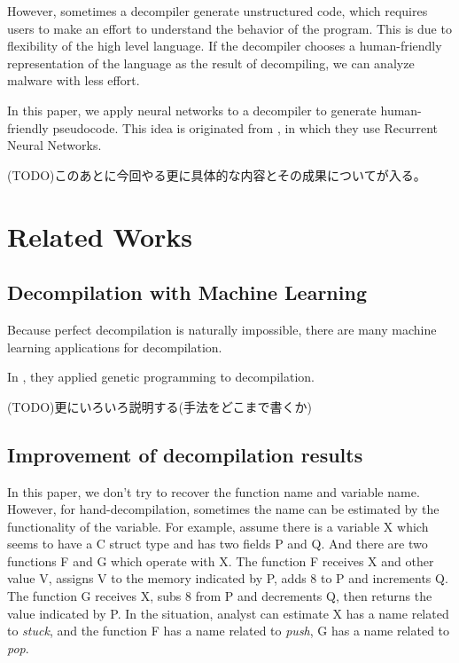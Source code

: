 \documentclass[senior,final,11pt]{iscs-thesis}
\begin{document}
However, sometimes a decompiler generate unstructured code, which requires users to make an effort to understand the behavior of the program. 
This is due to flexibility of the high level language. If the decompiler chooses a human-friendly representation of the language as the result of decompiling, we can analyze malware with less effort. 

In this paper, we apply neural networks to a decompiler to generate human-friendly pseudocode. 
This idea is originated from \cite{Motoneta}, in which they use Recurrent Neural Networks.

(TODO)このあとに今回やる更に具体的な内容とその成果についてが入る。

\section{Related Works}
\subsection{Decompilation with Machine Learning}
Because perfect decompilation is naturally impossible, there are many machine learning applications for decompilation.



In \cite{genetic_decompiler}, they applied genetic programming to decompilation.

(TODO)更にいろいろ説明する(手法をどこまで書くか)


% 

\subsection{Improvement of decompilation results}
In this paper, we don't try to recover the function name and variable name. 
However, for hand-decompilation, sometimes the name can be estimated by the functionality of the variable.
For example, assume there is a variable X which seems to have a C struct type and has two fields P and Q.
And there are two functions F and G which operate with X. 
The function F receives X and other value V, assigns V to the memory indicated by P, adds 8 to P and increments Q. 
The function G receives X, subs 8 from P and decrements Q, then returns the value indicated by P.
In the situation, analyst can estimate X has a name related to {\sl stuck}, and the function F has a name related to {\sl push}, G has a name related to {\sl pop}.
\end{document}
